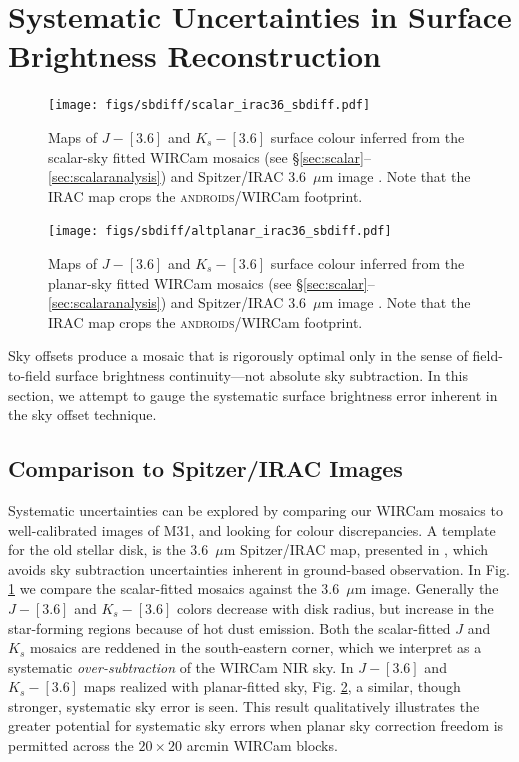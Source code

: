 \documentclass[iop]{emulateapj}
\newcommand{\androids}{\textsc{androids}}
\begin{document}
\section{Systematic Uncertainties in Surface Brightness Reconstruction}
\label{sec:systematics}

\begin{figure}[t]
    \centering
        \texttt{[image: figs/sbdiff/scalar\_irac36\_sbdiff.pdf]}
    \caption{Maps of $J-[3.6]$ and $K_s-[3.6]$ surface colour inferred from the scalar-sky fitted WIRCam mosaics (see \S\ref{sec:scalar}--\ref{sec:scalaranalysis}) and Spitzer/IRAC 3.6~$\mu$m image \citep{Barmby:2006}. Note that the IRAC map crops the \androids/WIRCam footprint.}
    \label{fig:scalar_irac36_sbdiff}
\end{figure}

\begin{figure}[t]
    \centering
        \texttt{[image: figs/sbdiff/altplanar\_irac36\_sbdiff.pdf]}
    \caption{Maps of $J-[3.6]$ and $K_s-[3.6]$ surface colour inferred from the planar-sky fitted WIRCam mosaics (see \S\ref{sec:scalar}--\ref{sec:scalaranalysis}) and Spitzer/IRAC 3.6~$\mu$m image \citep{Barmby:2006}. Note that the IRAC map crops the \androids/WIRCam footprint.}
    \label{fig:altplanar_irac36_sbdiff}
\end{figure}

Sky offsets produce a mosaic that is rigorously optimal only in the sense of field-to-field surface brightness continuity---not absolute sky subtraction. In this section, we attempt to gauge the systematic surface brightness error inherent in the sky offset technique.

\subsection{Comparison to Spitzer/IRAC Images}

Systematic uncertainties can be explored by comparing our WIRCam mosaics to well-calibrated images of M31, and looking for colour discrepancies.
A template for the old stellar disk, is the 3.6~$\mu$m Spitzer/IRAC map, presented in \cite{Barmby:2006}, which avoids sky subtraction uncertainties inherent in ground-based observation.
In Fig. \ref{fig:scalar_irac36_sbdiff} we compare the scalar-fitted mosaics against the 3.6~$\mu$m image. Generally the $J-[3.6]$ and $K_s-[3.6]$ colors decrease with disk radius, but increase in the star-forming regions because of hot dust emission. Both the scalar-fitted $J$ and $K_s$ mosaics are reddened in the south-eastern corner, which we interpret as a systematic \emph{over-subtraction} of the WIRCam NIR sky. In $J-[3.6]$ and $K_s-[3.6]$ maps realized with planar-fitted sky, Fig. \ref{fig:altplanar_irac36_sbdiff}, a similar, though stronger, systematic sky error is seen. This result qualitatively illustrates the greater potential for systematic sky errors when planar sky correction freedom is permitted across the $20\times 20$ arcmin WIRCam blocks.
\end{document}
